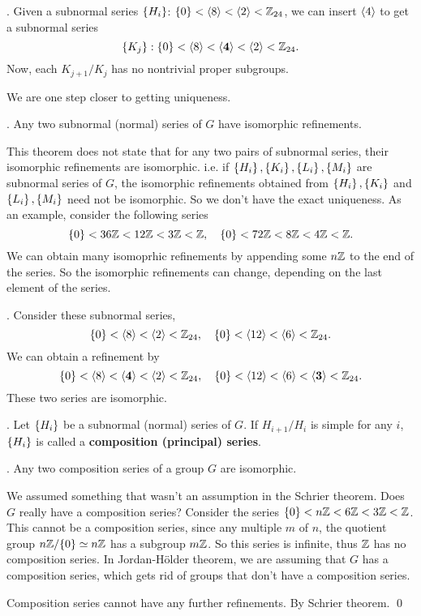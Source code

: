 \ex. Given a subnormal series \(\left\{ H_i \right\}\): \(\{0\} < \left\langle 8 \right\rangle < \left\langle 2 \right\rangle < \mathbb{Z}_{24}\), we can insert \(\left\langle 4 \right\rangle\) to get a subnormal series
\[
    \left\{ K_j \right\}: \{0\} < \left\langle 8 \right\rangle < \mathbf{\left\langle 4 \right\rangle} < \left\langle 2 \right\rangle < \mathbb{Z}_{24}.
\]
Now, each \(K_{j+1} / K_j\) has no nontrivial proper subgroups.

We are one step closer to getting uniqueness.

\thm.  Any two subnormal (normal) series of \(G\) have isomorphic refinements.

\rmk This theorem does not state that for any two pairs of subnormal series, their isomorphic refinements are isomorphic. i.e. if \(\left\{ H_i \right\}, \left\{ K_i \right\}, \left\{ L_i \right\}, \left\{ M_i \right\}\) are subnormal series of \(G\), the isomorphic refinements obtained from \(\left\{ H_i \right\}, \left\{ K_i \right\}\) and \(\left\{ L_i \right\}, \left\{ M_i \right\}\) need not be isomorphic. So we don't have the exact uniqueness. As an example, consider the following series
\[
    \{0\} < 36\mathbb{Z} < 12\mathbb{Z} < 3\mathbb{Z} < \mathbb{Z}, \quad \{0\} < 72\mathbb{Z} < 8\mathbb{Z} < 4\mathbb{Z} < \mathbb{Z}.
\]
We can obtain many isomoprhic refinements by appending some \(n\mathbb{Z}\) to the end of the series. So the isomorphic refinements can change, depending on the last element of the series.

\ex. Consider these subnormal series,
\[
    \{0\} < \left\langle 8 \right\rangle < \left\langle 2 \right\rangle < \mathbb{Z}_{24}, \quad \{0\} < \left\langle 12 \right\rangle < \left\langle 6 \right\rangle < \mathbb{Z}_{24}.
\]
We can obtain a refinement by
\[
    \{0\} < \left\langle 8 \right\rangle < \mathbf{\left\langle 4 \right\rangle} < \left\langle 2 \right\rangle < \mathbb{Z}_{24}, \quad \{0\} < \left\langle 12 \right\rangle < \left\langle 6 \right\rangle < \mathbf{\left\langle 3 \right\rangle} < \mathbb{Z}_{24}.
\]
These two series are isomorphic.

. Let \(\left\{ H_i \right\}\) be a subnormal (normal) series of \(G\). If \(H_{i+1} / H_i\) is simple for any \(i\), \(\left\{ H_i \right\}\) is called a \textbf{composition (principal) series}.

\thm.  Any two composition series of a group \(G\) are isomorphic.

\rmk We assumed something that wasn't an assumption in the Schrier theorem. Does \(G\) really have a composition series? Consider the series \(\{0\} < n\mathbb{Z} < 6\mathbb{Z} < 3\mathbb{Z} < \mathbb{Z}\). This cannot be a composition series, since any multiple \(m\) of \(n\), the quotient group \(n\mathbb{Z} / \{0\} \simeq n\mathbb{Z}\) has a subgroup \(m\mathbb{Z}\). So this series is infinite, thus \(\mathbb{Z}\) has no composition series. In Jordan-Hölder theorem, we are assuming that \(G\) has a composition series, which gets rid of groups that don't have a composition series.

\pf Composition series cannot have any further refinements. By Schrier theorem. \qed

